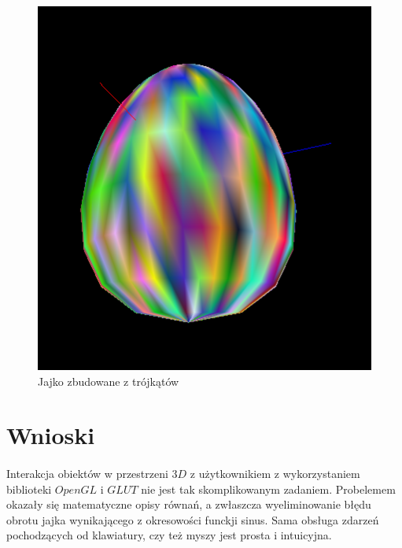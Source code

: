 \documentclass[wide,a4paper,titlepage,12pt] {article}
\begin{document}
\begin{figure}[htbp]
	\begin{center}
        	 \includegraphics[scale=0.7]{j3.PNG}
	\caption{Jajko zbudowane z trójkątów}
   	  \end{center}
\end{figure}
\newpage
\section{Wnioski}
\paragraph{}
Interakcja obiektów w przestrzeni $3D$ z użytkownikiem z wykorzystaniem biblioteki $OpenGL$ i $GLUT$ nie jest tak skomplikowanym zadaniem. Probelemem okazały się matematyczne opisy równań, a zwłaszcza wyeliminowanie błędu obrotu jajka wynikającego z okresowości funckji sinus. Sama obsługa zdarzeń pochodzących od klawiatury, czy też myszy jest prosta i intuicyjna.
\end{document}
